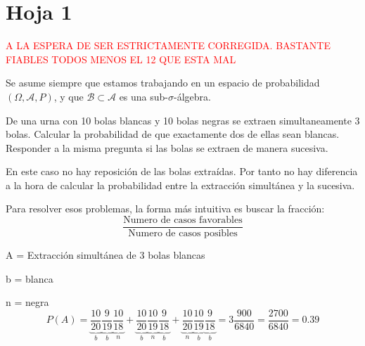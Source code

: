 %
%
%

\section{Hoja 1}

\textcolor{red}{A LA ESPERA DE SER ESTRICTAMENTE CORREGIDA. BASTANTE FIABLES TODOS MENOS EL 12  QUE ESTA MAL}

Se asume siempre que estamos trabajando en un espacio de probabilidad $(\Omega, \mathcal{A}, P)$, y que  $\mathcal{B}\subset \mathcal{A}$ es una sub-$\sigma$-\'algebra.

\begin{problem}[1]De una urna con 10 bolas blancas y 10 bolas negras se extraen simultaneamente 3 bolas. 
Calcular la probabilidad de que exactamente dos de ellas sean blancas. Responder a la misma
pregunta si las bolas se extraen de manera sucesiva.
\solution

\begin{expla}
En este caso no hay reposición de las bolas extraídas. Por tanto no hay diferencia a la hora de calcular la probabilidad entre la extracción simultánea y la sucesiva.

Para resolver esos problemas, la forma más intuitiva es buscar la fracción:
\[
\frac{\text{Numero de casos favorables}}{\text{Numero de casos posibles}}
\]
\end{expla}
A = Extracción simultánea de 3 bolas blancas

b = blanca

n = negra
\[
P(A)=\underbrace{\frac{10}{20}}_{b}\underbrace{\frac{9}{19}}_{b}\underbrace{\frac{10}{18}}_{n}+\underbrace{\frac{10}{20}}_{b}\underbrace{\frac{10}{19}}_{n}\underbrace{\frac{9}{18}}_{b}+\underbrace{\frac{10}{20}}_{n}\underbrace{\frac{10}{19}}_{b}\underbrace{\frac{9}{18}}_{b} = 3\frac{900}{6840}=\frac{2700}{6840}=0.39
\]

\end{problem}


